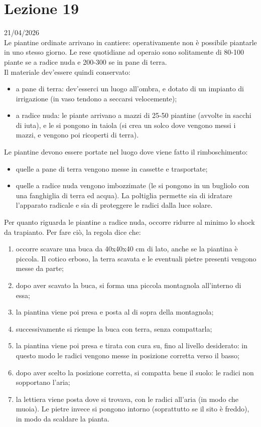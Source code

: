 \section{Lezione 19} \hfill 21/04/2026\\
Le piantine ordinate arrivano in cantiere: operativamente non è possibile piantarle in uno stesso giorno. Le rese quotidiane ad operaio sono solitamente di 80-100 piante se a radice nuda e 200-300 se in pane di terra.\\
Il materiale dev'essere quindi conservato:
\begin{itemize}[nosep]
    \item a pane di terra: dev'esserci un luogo all'ombra, e dotato di un impianto di irrigazione (in vaso tendono a seccarsi velocemente);
    \item a radice nuda: le piante arrivano a mazzi di 25-50 piantine (avvolte in sacchi di iuta), e le si pongono in taiola (si crea un solco dove vengono messi i mazzi, e vengono poi ricoperti di terra). 
\end{itemize}
Le piantine devono essere portate nel luogo dove viene fatto il rimboschimento:
\begin{itemize}[nosep]
    \item quelle a pane di terra vengono messe in cassette e trasportate;
    \item quelle a radice nuda vengono imbozzimate (le si pongono in un bugliolo con una fanghiglia di terra ed acqua). La poltiglia permette sia di idratare l'apparato radicale e sia di proteggere le radici dalla luce solare.
\end{itemize}
Per quanto riguarda le piantine a radice nuda, occorre ridurre al minimo lo shock da trapianto. Per fare ciò, la regola dice che:
\begin{enumerate}[nosep]
    \item occorre scavare una buca da 40x40x40 cm di lato, anche se la piantina è piccola. Il cotico erboso, la terra scavata e le eventuali pietre presenti vengono messe da parte;
    \item dopo aver scavato la buca, si forma una piccola montagnola all'interno di essa;
    \item la piantina viene poi presa e posta al di sopra della montagnola;
    \item successivamente si riempe la buca con terra, senza compattarla;
    \item la piantina viene poi presa e tirata con cura su, fino al livello desiderato: in questo modo le radici vengono messe in posizione corretta verso il basso;
    \item dopo aver scelto la posizione corretta, si compatta bene il suolo: le radici non sopportano l'aria;
    \item la lettiera viene posta dove si trovava, con le radici all'aria (in modo che muoia). Le pietre invece si pongono intorno (soprattutto se il sito è freddo), in modo da scaldare la pianta.
\end{enumerate} 
